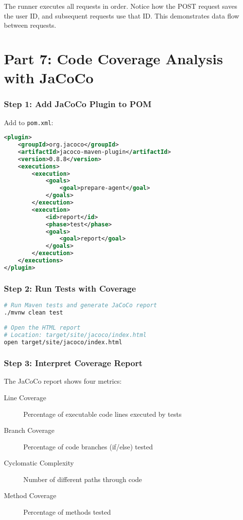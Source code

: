 \documentclass[12pt,a4paper]{article}
\begin{document}
\begin{tipbox}
The runner executes all requests in order. Notice how the POST request saves the user ID, and subsequent requests use that ID. This demonstrates data flow between requests.
\end{tipbox}

\newpage

\part{Part 7: Code Coverage Analysis with JaCoCo}

\section{Step 1: Add JaCoCo Plugin to POM}

Add to \texttt{pom.xml}:

\begin{lstlisting}[language=xml, caption=pom.xml - JaCoCo Configuration]
<plugin>
    <groupId>org.jacoco</groupId>
    <artifactId>jacoco-maven-plugin</artifactId>
    <version>0.8.8</version>
    <executions>
        <execution>
            <goals>
                <goal>prepare-agent</goal>
            </goals>
        </execution>
        <execution>
            <id>report</id>
            <phase>test</phase>
            <goals>
                <goal>report</goal>
            </goals>
        </execution>
    </executions>
</plugin>
\end{lstlisting}

\section{Step 2: Run Tests with Coverage}

\begin{lstlisting}[language=bash, caption=Generate Coverage Report]
# Run Maven tests and generate JaCoCo report
./mvnw clean test

# Open the HTML report
# Location: target/site/jacoco/index.html
open target/site/jacoco/index.html
\end{lstlisting}

\section{Step 3: Interpret Coverage Report}

The JaCoCo report shows four metrics:

\begin{description}
    \item[Line Coverage] Percentage of executable code lines executed by tests
    \item[Branch Coverage] Percentage of code branches (if/else) tested
    \item[Cyclomatic Complexity] Number of different paths through code
    \item[Method Coverage] Percentage of methods tested
\end{description}
\end{document}
